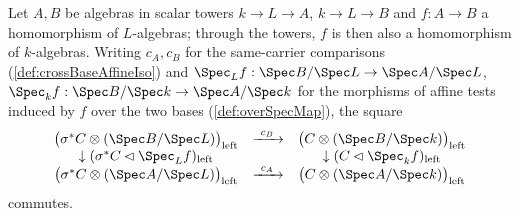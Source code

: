 \begin{theorem}
  \label{thm:crossBaseAffineIso_naturality}
  \leanok
  Let \(A, B\) be algebras in scalar towers \(k \to L \to A\), \(k \to L \to B\) and
  \(f : A \to B\) a homomorphism of \(L\)-algebras; through the towers, \(f\) is then
  also a homomorphism of \(k\)-algebras. Writing \(c_A, c_B\) for the same-carrier
  comparisons (\ref{def:crossBaseAffineIso}) and \(\Spec_L f : \Spec B/\Spec L \to
  \Spec A/\Spec L\), \(\Spec_k f : \Spec B/\Spec k \to \Spec A/\Spec k\) for the
  morphisms of affine tests induced by \(f\) over the two bases (\ref{def:overSpecMap}),
  the square
  \[
    \begin{array}{ccc}
      \bigl(\sigma^{*}C \otimes (\Spec B/\Spec L)\bigr)_{\mathrm{left}} &
        \xrightarrow{\ c_B\ } &
        \bigl(C \otimes (\Spec B/\Spec k)\bigr)_{\mathrm{left}} \\
      \downarrow (\sigma^{*}C \lhd \Spec_L f)_{\mathrm{left}} & &
        \downarrow (C \lhd \Spec_k f)_{\mathrm{left}} \\
      \bigl(\sigma^{*}C \otimes (\Spec A/\Spec L)\bigr)_{\mathrm{left}} &
        \xrightarrow{\ c_A\ } &
        \bigl(C \otimes (\Spec A/\Spec k)\bigr)_{\mathrm{left}}
    \end{array}
  \]
  commutes.
\end{theorem}
